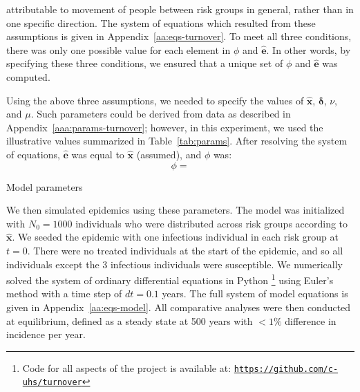attributable to movement of people between risk groups in general,
rather than in one specific direction.
The system of equations which resulted from these assumptions
is given in Appendix~\ref{aa:eqs-turnover}.
To meet all three conditions, there was only one possible value
for each element in $\phi$ and $\bm{\hat{e}}$.
In other words, by specifying these three conditions,
we ensured that a unique set of $\phi$ and $\bm{\hat{e}}$ was computed.
\par
Using the above three assumptions,
we needed to specify the values of $\bm{\hat{x}}$, $\bm{\delta}$, $\nu$, and $\mu$.
Such parameters could be derived from data as described in Appendix~\ref{aaa:params-turnover};
however, in this experiment, we used the illustrative values summarized in
Table~\ref{tab:params}.
After resolving the system of equations,
$\bm{\hat{e}}$ was equal to $\bm{\hat{x}}$ (assumed), and $\phi$ was:
\begin{equation}
\label{eq:phi-values}
\phi = 
\end{equation}
\begin{table}
  \centering
  \caption{Model parameters}
  \label{tab:params}
  
\end{table}
\par
We then simulated epidemics using these parameters.
The model was initialized with $N_0 = 1000$ individuals
who were distributed across risk groups according to $\bm{\hat{x}}$.
We seeded the epidemic with
one infectious individual in each risk group at $t = 0$.
There were no treated individuals at the start of the epidemic,
and so all individuals except the 3 infectious individuals were susceptible.
We numerically solved the system of ordinary differential equations
in Python%
\footnote{Code for all aspects of the project is available at:
  \href{https://github.com/c-uhs/turnover}{\texttt{https://github.com/c-uhs/turnover}}}
using Euler's method with a time step of $dt = 0.1$ years.
The full system of model equations is given in Appendix~\ref{aa:eqs-model}.
All comparative analyses were then conducted at equilibrium,
defined as a steady state at 500 years with $<1\%$ difference in incidence per year.
